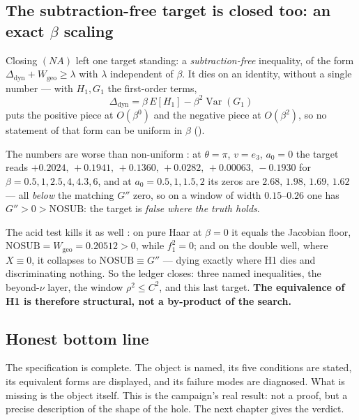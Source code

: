 \subsection{The subtraction-free target is closed too: an exact $\beta$ scaling}

Closing $(NA)$ left one target standing: a \emph{subtraction-free} inequality, of the form
$\Delta_{\mathrm{dyn}}+W_{\mathrm{geo}}\ge\lambda$ with $\lambda$ independent of $\beta$. It dies on an
identity, without a single number \LT{} --- with $H_1,G_1$ the first-order terms,
\begin{equation}
\Delta_{\mathrm{dyn}}=\beta\,E[H_1]-\beta^{2}\operatorname{Var}(G_1)
\label{eq:nosub}
\end{equation}
puts the positive piece at $O(\beta^{0})$ and the negative piece at $O(\beta^{2})$, so no statement of
that form can be uniform in $\beta$ ().

The numbers are worse than non-uniform \LE: at $\theta=\pi$, $v=e_3$, $a_0=0$ the target reads
$+0.2024,\,+0.1941,\,+0.1360,\,+0.0282,\,+0.00063,\,-0.1930$ for $\beta=0.5,1,2.5,4,4.3,6$, and at
$a_0=0.5,1,1.5,2$ its zeros are $2.68,\,1.98,\,1.69,\,1.62$ --- all \emph{below} the matching $G''$ zero,
so on a window of width $0.15$--$0.26$ one has $G''>0>\mathrm{NOSUB}$: the target is \emph{false where
the truth holds}.

The acid test kills it as well \LN: on pure Haar at $\beta=0$ it equals the Jacobian floor,
$\mathrm{NOSUB}=W_{\mathrm{geo}}=0.20512>0$, while $f_1^2=0$; and on the double well, where $X\equiv0$,
it collapses to $\mathrm{NOSUB}\equiv G''$ --- dying exactly where H1 dies and discriminating nothing. So
the ledger closes: three named inequalities, the beyond-$\nu$ layer, the window $\rho^2\le C^2$, and this
last target. \textbf{The equivalence of H1 is therefore structural, not a by-product of the search.}

\subsection{Honest bottom line}

The specification is complete. The object is named, its five conditions are stated, its
equivalent forms are displayed, and its failure modes are diagnosed. What is missing is the
object itself. This is the campaign's real result: not a proof, but a precise description of the
shape of the hole. The next chapter gives the verdict.
